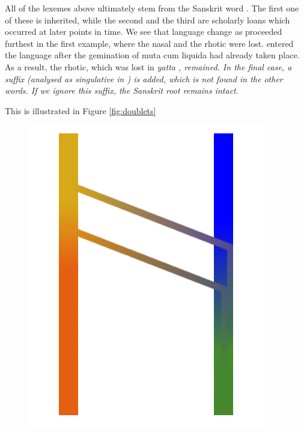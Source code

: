 \documentclass[a4paper,10pt]{article}
\begin{document}
All of the lexemes above ultimately stem from the Sanskrit word .
The first one of these is inherited, while the second and the third are scholarly loans which occurred at later points in time. We see that language change as proceeded furthest in the first example, where the nasal and the rhotic were lost.  entered the language after the gemination of muta cum liquida had already taken place. As a result, the rhotic, which was lost in \em yatta \em, remained.  In the final case, a suffix (analysed as singulative in \citet{NitzEtAl2009}) is added, which is not found in the other words. If we ignore this suffix, the Sanskrit root remains intact. 


This is illustrated in Figure \ref{fig:doublets}

\begin{figure}
\centering
    \includegraphics[height=.3\textheight]{doublet.png}

\end{figure}
\end{document}
